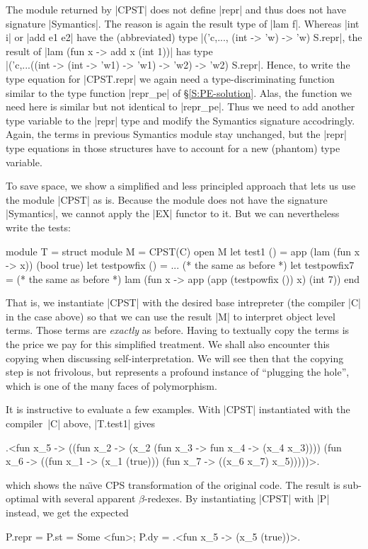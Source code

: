 \documentclass[preprint]{sigplanconf}
\begin{document}
The module returned by |CPST| does not define |repr|
and thus does not have signature |Symantics|.
The reason is again the result type of |lam f|. Whereas
|int i| or |add e1 e2| have the (abbreviated) 
type |('c,..., (int -> 'w) -> 'w) S.repr|,
the result of |lam (fun x -> add x (int 1))| has type\\
|('c,...((int -> (int -> 'w1) -> 'w1) -> 'w2) -> 'w2) S.repr|. 
Hence, to write the type equation for |CPST.repr| we again need a 
type-discriminating
function similar to the type function |repr_pe| of
\S\ref{S:PE-solution}. Alas, the function we need here is
similar but not identical to |repr_pe|. Thus we need to add 
another type variable to the |repr| type and modify the Symantics
signature accodringly. Again, the terms in previous Symantics module
stay unchanged, but the |repr| type equations in those structures have to
account for a new (phantom) type variable.

To save space, we show a simplified and less principled approach that
lets us use the module |CPST| as is. Because the module does not
have the signature |Symantics|, we cannot apply the |EX| functor to it.
But we can nevertheless write the tests:
\begin{code}
module T = struct
 module M = CPST(C)
 open M
 let test1 () = app (lam (fun x -> x)) (bool true)
 let testpowfix () = ... (* the same as before *)
 let testpowfix7 = (* the same as before *)
    lam (fun x -> app (app (testpowfix ()) x) (int 7))
end
\end{code}
That is, we instantiate |CPST| with the desired base intrepreter (the
compiler |C| in the case above) so that we can use the result |M| to
interpret object level terms. Those terms are \emph{exactly} as before.
Having to textually copy the terms is the
price we pay for this simplified treatment. We shall also encounter this
copying when discussing self-interpretation.  We
will see then that the copying step is not frivolous, but represents
a profound instance of 
``plugging the hole'', which is one of the many faces of polymorphism.

It is instructive to evaluate a few examples. With 
|CPST| instantiated with the compiler~|C| above,
|T.test1| gives
\begin{code}
.<fun x_5 -> ((fun x_2 -> 
        (x_2 (fun x_3 -> fun x_4 -> (x_4 x_3))))
        (fun x_6 -> ((fun x_1 -> (x_1 (true))) 
        (fun x_7 -> ((x_6 x_7) x_5)))))>.
\end{code}
which shows the na\"{\i}ve CPS transformation of the original code.
The result is sub-optimal with several apparent $\beta$-redexes. 
By instantiating |CPST| with |P| instead, we get the expected
\begin{code}
  P.repr = {P.st = Some <fun>;
            P.dy = .<fun x_5 -> (x_5 (true))>.}
\end{code}
\end{document}
